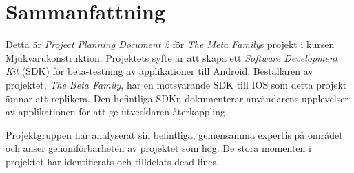 \section*{Sammanfattning} %
Detta är \textit{Project Planning Document 2} för \textit{The Meta Family}s projekt i kursen Mjukvarukonstruktion. Projektets syfte är att skapa ett \textit{Software Development Kit} (SDK) för beta-testning av applikationer till Android. Beställaren av projektet, \textit{The Beta Family}, har en motsvarande SDK till IOS som detta projekt ämnar att replikera. Den befintliga SDKn dokumenterar användarens upplevelser av applikationen för att ge utvecklaren återkoppling.

Projektgruppen har analyserat sin befintliga, gemensamma expertis på området och anser genomförbarheten av projektet som hög. De stora momenten i projektet har identifierats och tilldelats dead-lines.
